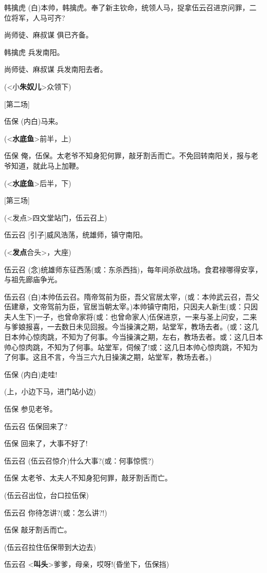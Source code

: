 韩擒虎
(白)本帅，韩擒虎。奉了新主钦命，统领人马，捉拿伍云召进京问罪，二位将军，人马可齐?

尚师徒、麻叔谋 俱已齐备。

韩擒虎 兵发南阳。

尚师徒、麻叔谋 兵发南阳去者。

(\textless{}小\textbf{朱奴儿}\textgreater{}众领下)

{[}第二场{]}

伍保 (内白)马来。

(\textless{}\textbf{水底鱼}\textgreater{}前半，上)

伍保
俺，伍保。太老爷不知身犯何罪，敲牙割舌而亡。不免回转南阳关，报与老爷知道，就此马上加鞭。

(\textless{}\textbf{水底鱼}\textgreater{}后半，下)

{[}第三场{]}

(\textless{}发点\textgreater{}四文堂站门，伍云召上)

伍云召 {[}引子{]}威风浩荡，统雄师，镇守南阳。

(\textless{}\textbf{发点}合头\textgreater{}，大座)

伍云召
(念)统雄师东征西荡(或：东杀西挡)，每年间杀砍战场。食君禄哪得安享，与祖先廊庙争光。

伍云召
(白)本帅伍云召。隋帝驾前为臣，吾父官居太宰，(或：本帅武云召，吾父伍建章，文帝驾前为臣，官居当朝太宰。)本帅镇守南阳，只因夫人新生(或：只因夫人生下)一子，也曾命家将(或：也曾命家人)伍保进京，一来与圣上问安，二来与爹娘报喜，一去数日未见回报。今当操演之期，站堂军，教场去者。(或：这几日本帅心惊肉跳，不知为了何事。今当操演之期，左右，教场去者。或：这几日本帅心惊肉跳，不知为了何事。站堂军，伺候了!或：这几日本帅心惊肉跳，不知为了何事。这且不言，今当三六九日操演之期，站堂军，教场去者。)

伍保 (内白)走哇!

(上，小边下马，进门站小边)

伍保 参见老爷。

伍云召 伍保回来了?

伍保 回来了，大事不好了!

伍云召 (伍云召惊介)什么大事?(或：何事惊慌?)

伍保 太老爷、太夫人不知身犯何罪，敲牙割舌而亡。

(伍云召出位，台口拉伍保)

伍云召 你待怎讲?(或：怎么讲?!)

伍保 敲牙割舌而亡。

(伍云召拉住伍保带到大边去)

伍云召
\textless{}\textbf{叫头}\textgreater{}爹爹，母亲，哎呀!(昏坐下，伍保挡)

